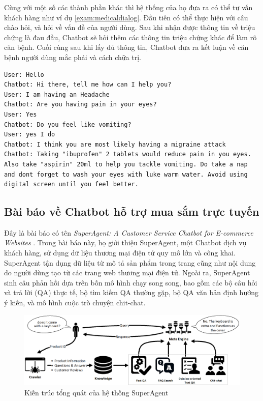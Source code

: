 Cùng với một số các thành phần khác thì hệ thống của họ đưa ra có thể tư vấn khách hàng như ví dụ \ref{exam:medicaldialog}. Đầu tiên có thể thực hiện với câu chào hỏi, và hỏi về vấn đề của người dùng. Sau khi nhận được thông tin về triệu chứng là đau đầu, Chatbot sẽ hỏi thêm các thông tin triệu chứng khác để làm rõ căn bệnh. Cuối cùng sau khi lấy đủ thông tin, Chatbot đưa ra kết luận về căn bệnh người dùng mắc phải và cách chữa trị.

\renewcommand{\lstlistingname}{Ví dụ}
\begin{lstlisting}[caption={Một mẫu hội thoại của Chatbot},label={exam:medicaldialog},language=exam_en,firstnumber=1]
User: Hello
Chatbot: Hi there, tell me how can I help you?
User: I am having an Headache
Chatbot: Are you having pain in your eyes?
User: Yes
Chatbot: Do you feel like vomiting?
User: yes I do
Chatbot: I think you are most likely having a migraine attack
Chatbot: Taking "ibuprofen" 2 tablets would reduce pain in you eyes. Also take "aspirin" 20ml to help you tackle vomiting. Do take a nap and dont forget to wash your eyes with luke warm water. Avoid using digital screen until you feel better.
\end{lstlisting}

\subsection{Bài báo về Chatbot hỗ trợ mua sắm trực tuyến}
Đây là bài báo có tên \textit{SuperAgent: A Customer Service Chatbot for E-commerce Websites} \cite{superagent}. Trong bài báo này, họ giới thiệu SuperAgent, một Chatbot dịch vụ khách hàng, sử dụng dữ liệu thương mại điện tử quy mô lớn và công khai. SuperAgent tận dụng dữ liệu từ mô tả sản phẩm trong trang cũng như nội dung do người dùng tạo từ các trang web thương mại điện tử. Ngoài ra, SuperAgent sinh câu phản hồi dựa trên bốn mô hình chạy song song, bao gồm các bộ câu hỏi và trả lời (QA) thực tế, bộ tìm kiếm QA thường gặp, bộ QA văn bản định hướng ý kiến, và mô hình cuộc trò chuyện chit-chat.

\begin{center}
    \begin{figure}[ht!]
        \begin{center}
         \includegraphics[scale=0.45]{chapter2/img/superagent.png}
        \end{center}
        \caption{Kiến trúc tổng quát của hệ thống SuperAgent}
        \label{fig:superagent}
    \end{figure}
\end{center}

